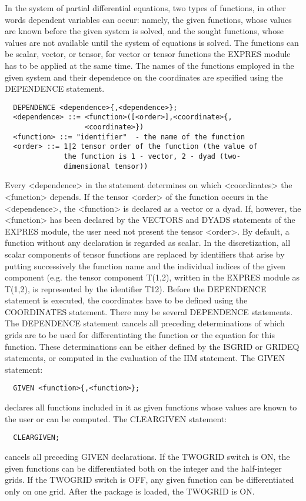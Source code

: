      In  the  system  of  partial  differential  equations, two types of
functions, in other words dependent  variables  can  occur:  namely, the
given  functions,  whose  values  are  known  before the given system is
solved, and the sought functions, whose  values are  not available until
the system  of equations is solved. The functions can be scalar, vector,
or tensor, for vector or tensor  functions the  EXPRES module  has to be
applied at  the same  time. The  names of  the functions employed in the
given system and their dependence on the coordinates are specified using
the DEPENDENCE statement.
\begin{verbatim}
  DEPENDENCE <dependence>{,<dependence>};
  <dependence> ::= <function>([<order>],<coordinate>{,
                   <coordinate>})
  <function> ::= "identifier"  - the name of the function
  <order> ::= 1|2 tensor order of the function (the value of
              the function is 1 - vector, 2 - dyad (two-
              dimensional tensor))
\end{verbatim}
Every <dependence>  in the  statement determines  on which <coordinates>
the <function> depends. If the tensor <order> of the function  occurs in
the <dependence>,  the <function> is declared as a vector or a dyad. If,
however, the <function> has  been  declared  by  the  VECTORS  and DYADS
statements of  the EXPRES  module, the  user need not present the tensor
<order>. By default, a function without  any declaration  is regarded as
scalar. In the discretization, all scalar components of tensor functions
are replaced by  identifiers  that  arise  by  putting  successively the
function name  and the  individual indices  of the given component (e.g.
the tensor component T(1,2), written in the EXPRES module as  T(1,2), is
represented by  the identifier  T12). Before the DEPENDENCE statement is
executed, the coordinates  have  to  be  defined  using  the COORDINATES
statement. There  may be  several DEPENDENCE  statements. The DEPENDENCE
statement cancels all preceding determinations of which grids  are to be
used for differentiating the function or the equation for this function.
These determinations can be  either  defined  by  the  ISGRID  or GRIDEQ
statements, or computed in the evaluation of the IIM statement.
     The GIVEN statement:
\begin{verbatim}
  GIVEN <function>{,<function>};
\end{verbatim}
declares all  functions included  in it  as given functions whose values
are known to the user or can be computed. The CLEARGIVEN statement:
\begin{verbatim}
  CLEARGIVEN;
\end{verbatim}
cancels all preceding GIVEN declarations. If  the TWOGRID  switch is ON,
the given  functions can  be differentiated  both on the integer and the
half-integer grids. If the TWOGRID switch is OFF, any given function can
be differentiated  only on  one grid.  After the  package is loaded, the
TWOGRID is ON.


